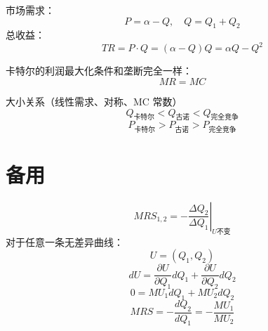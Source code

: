 \documentclass[cn,hazy,blue,14pt,screen]{elegantnote}
\begin{document}
市场需求：
$$ P = \alpha- Q, \quad Q = Q_1 + Q_2$$
总收益：
$$TR = P \cdot Q = (\alpha - Q)Q = \alpha Q - Q^2$$

卡特尔的利润最大化条件和垄断完全一样：
$$MR = MC$$

大小关系（线性需求、对称、MC 常数）
\[Q_{\text{卡特尔}} < Q_{\text{古诺}} < Q_{\text{完全竞争}}\]
\[P_{\text{卡特尔}} > P_{\text{古诺}} > P_{\text{完全竞争}}\]

\section{备用}
$$MRS_{1,2} = \left. -\frac{\Delta Q_2}{\Delta Q_1} \right|_{U\text{不变}}$$
$\text{对于任意一条无差异曲线：}$
$$U = (Q_1, Q_2) $$ 
$$dU = \frac{\partial U}{\partial Q_1}dQ_1 + \frac{\partial U}{\partial Q_2}dQ_2$$
$$ 0 = MU_1 dQ_1 + MU_2 dQ_2 $$
$$ MRS = -\frac{dQ_2}{dQ_1} = -\frac{MU_1}{MU_2} $$
\end{document}
